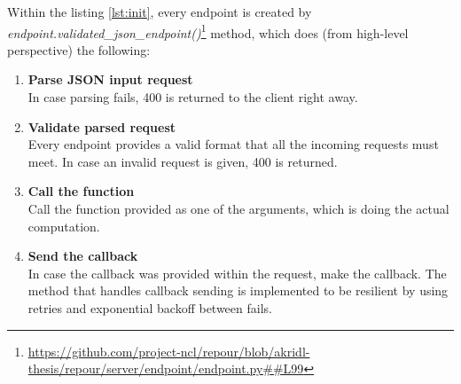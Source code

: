 \documentclass[../main.tex]{subfiles}
\begin{document}
Within the listing \ref{lst:init}, every endpoint is created by \textit{endpoint.validated\_json\_endpoint()}\footnote{\url{https://github.com/project-ncl/repour/blob/akridl-thesis/repour/server/endpoint/endpoint.py##L99}} method, which does (from high-level perspective) the following:

\begin{enumerate}
    \item \textbf{Parse JSON input request}\\
    In case parsing fails, 400 is returned to the client right away.

    \item \textbf{Validate parsed request}\\
    Every endpoint provides a valid format that all the incoming requests must meet. In case an invalid request is given, 400 is returned.

    \item \textbf{Call the function}\\
    Call the function provided as one of the arguments, which is doing the actual computation.

    \item \textbf{Send the callback}\\
    In case the callback was provided within the request, make the callback. The method that handles callback sending is implemented to be resilient by using retries and exponential backoff between fails.

\end{enumerate}
\end{document}
